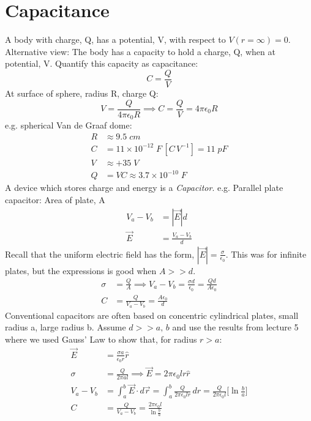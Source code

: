 \documentclass[a4paper, 11pt, normalem]{report}
\begin{document}
\section{Capacitance}
A body with charge, Q, has a potential, V, with respect to $V(r = \infty) = 0$.
Alternative view: The body has a capacity to hold a charge, Q, when at potential, V. Quantify this capacity as capacitance:
\begin{equation}
    C = \frac{Q}{V}
\end{equation}
At surface of sphere, radius R, charge Q:
\begin{equation}
    V = \frac{Q}{4\pi\epsilon_{0} R} \implies C = \frac{Q}{V} = 4\pi\epsilon_{0}R
\end{equation}
e.g. spherical Van de Graaf dome:
\begin{align}
    R &\approx 9.5 \; cm \\
    C &= 11 \times 10^{-12} \; F\,[C\,V^{-1}] = 11 \; pF \\
    V &\approx + 35\;V \\
    Q &= VC \approx 3.7 \times 10^{-10} \; F
\end{align}
A device which stores charge and energy is a \emph{Capacitor}.
e.g. Parallel plate capacitor:
Area of plate, A
\begin{align}
    V_{a} - V_{b} &= |\vec{E}|d \\
    \vec{E} &= \frac{V_{a} - V_{b}}{d}
\end{align}
Recall that the uniform electric field has the form, $|\vec{E}| = \frac{\sigma}{\epsilon_{0}}$.
This was for infinite plates, but the expressions is good when $A >> d$.
\begin{align}
    \sigma &= \frac{Q}{A} \implies V_{a} - V_{b} = \frac{\sigma d}{\epsilon_{0}} = \frac{Q d}{A \epsilon_{0}} \\
    C &= \frac{Q}{V_{a} - V_{b}} = \frac{A \epsilon_{0}}{d}
\end{align}
Conventional capacitors are often based on concentric cylindrical plates, small radius a, large radius b.
Assume $d >> a,\,b$ and use the results from lecture 5 where we used Gauss' Law to show that, for radius $r > a$:
\begin{align}
    \vec{E} &= \frac{\sigma a}{\epsilon_{0} r} \hat{r} \\
    \sigma &= \frac{Q}{2\pi a l} \implies \vec{E} = 2\pi \epsilon_{0} l r \hat{r} \\
    V_{a} - V_{b} &= \int_{a}^{b} \vec{E} \cdot d\vec{r} = \int_{a}^{b} \frac{Q}{2\pi\epsilon_{0}lr}\,dr = \frac{Q}{2\pi\epsilon_{0}l}\Big[\ln\frac{b}{a}\Big] \\
    C &= \frac{Q}{V_{a} - V_{b}} = \frac{2\pi\epsilon_{0}l}{\ln\tfrac{b}{a}}
\end{align}
\end{document}

